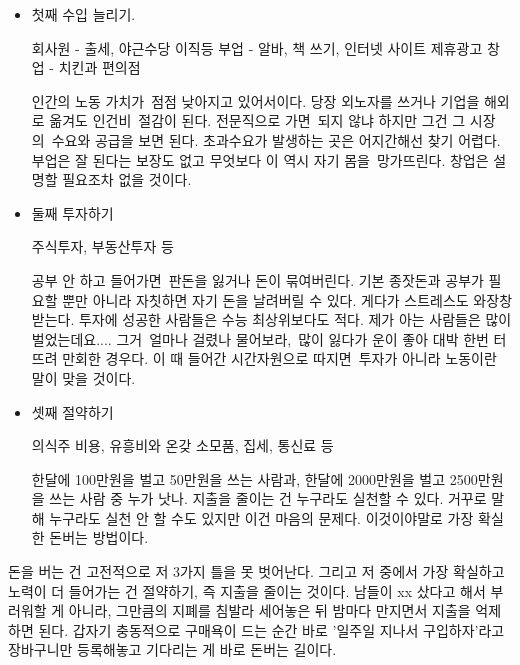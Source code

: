 \begin{itemize}
    \item 첫째 수입 늘리기.
    \vspace{5mm}
    
    회사원 - 출세, 야근수당 이직등
    부업 - 알바, 책 쓰기, 인터넷 사이트 제휴광고
    창업 - 치킨과 편의점
    \vspace{5mm}
    
    인간의 노동 가치가 점점 낮아지고 있어서이다. 당장 외노자를 쓰거나 기업을 해외로 옮겨도 인건비 절감이 된다.
    전문직으로 가면 되지 않냐 하지만 그건 그 시장의 수요와 공급을 보면 된다. 초과수요가 발생하는 곳은 어지간해선 찾기 어렵다.
    부업은 잘 된다는 보장도 없고 무엇보다 이 역시 자기 몸을 망가뜨린다. 창업은 설명할 필요조차 없을 것이다.
    \vspace{5mm}
    
    \item 둘째 투자하기
    \vspace{5mm}
    
    주식투자, 부동산투자 등
    \vspace{5mm}
        
    공부 안 하고 들어가면 판돈을 잃거나 돈이 묶여버린다.
    기본 종잣돈과 공부가 필요할 뿐만 아니라 자칫하면 자기 돈을 날려버릴 수 있다. 게다가 스트레스도 와장창 받는다.
    투자에 성공한 사람들은 수능 최상위보다도 적다.
    제가 아는 사람들은 많이 벌었는데요.... 그거 얼마나 걸렸나 물어보라, 많이 잃다가 운이 좋아 대박 한번 터뜨려 만회한 경우다.
    이 때 들어간 시간자원으로 따지면 투자가 아니라 노동이란 말이 맞을 것이다.
    \vspace{5mm}

    \item 셋째 절약하기
    \vspace{5mm}

    의식주 비용, 유흥비와 온갖 소모품, 집세, 통신료 등
    \vspace{5mm}

    한달에 100만원을 벌고 50만원을 쓰는 사람과, 한달에 2000만원을 벌고 2500만원을 쓰는 사람 중 누가 낫나.
    지출을 줄이는 건 누구라도 실천할 수 있다. 거꾸로 말해 누구라도 실천 안 할 수도 있지만 이건 마음의 문제다.
    이것이야말로 가장 확실한 돈버는 방법이다.
    \vspace{5mm}

\end{itemize}
돈을 버는 건 고전적으로 저 3가지 틀을 못 벗어난다.
그리고 저 중에서 가장 확실하고 노력이 더 들어가는 건 절약하기, 즉 지출을 줄이는 것이다.
남들이 xx 샀다고 해서 부러워할 게 아니라, 그만큼의 지폐를 침발라 세어놓은 뒤 밤마다 만지면서 지출을 억제하면 된다.
갑자기 충동적으로 구매욕이 드는 순간 바로 '일주일 지나서 구입하자'라고 장바구니만 등록해놓고 기다리는 게 바로 돈버는 길이다.
\vspace{5mm}


